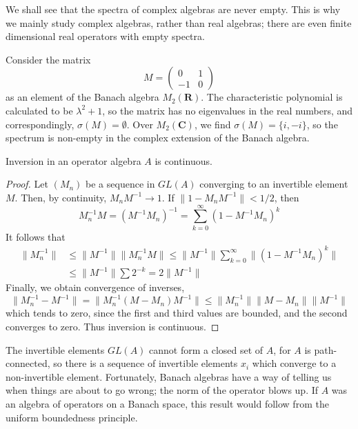 We shall see that the spectra of complex algebras are never empty. This is why we mainly study complex algebras, rather than real algebras; there are even finite dimensional real operators with empty spectra.

\begin{example}
    Consider the matrix
    \[ M = \begin{pmatrix} 0 & 1 \\ -1 & 0 \end{pmatrix} \]
    as an element of the Banach algebra $M_2(\mathbf{R})$. The characteristic polynomial is calculated to be $\lambda^2 + 1$, so the matrix has no eigenvalues in the real numbers, and correspondingly, $\sigma(M) = \emptyset$. Over $M_2(\mathbf{C})$, we find $\sigma(M) = \{ i, -i \}$, so the spectrum is non-empty in the complex extension of the Banach algebra.
\end{example}

\begin{lemma}
    Inversion in an operator algebra $A$ is continuous.
\end{lemma}
\begin{proof}
    Let $(M_n)$ be a sequence in $GL(A)$ converging to an invertible element $M$. Then, by continuity, $M_nM^{-1} \to 1$. If $\| 1 - M_n M^{-1} \| < 1/2$, then
    \[ M_n^{-1} M = (M^{-1}M_n)^{-1} = \sum_{k = 0}^\infty (1 - M^{-1}M_n)^k \]
    It follows that
    \begin{align*}
        \| M_n^{-1} \| &\leq \| M^{-1} \| \| M_n^{-1} M \| \leq \| M^{-1} \| \sum_{k = 0}^\infty \| (1 - M^{-1} M_n)^k \|\\
        &\leq \| M^{-1} \| \sum 2^{-k} = 2 \| M^{-1} \|
    \end{align*}
    Finally, we obtain convergence of inverses,
    \[ \| M_n^{-1} - M^{-1} \| = \| M_n^{-1} (M - M_n) M^{-1} \| \leq \| M_n^{-1} \| \| M - M_n \| \| M^{-1} \| \]
    which tends to zero, since the first and third values are bounded, and the second converges to zero. Thus inversion is continuous.
\end{proof}

The invertible elements $GL(A)$ cannot form a closed set of $A$, for $A$ is path-connected, so there is a sequence of invertible elements $x_i$ which converge to a non-invertible element. Fortunately, Banach algebras have a way of telling us when things are about to go wrong; the norm of the operator blows up. If $A$ was an algebra of operators on a Banach space, this result would follow from the uniform boundedness principle.

